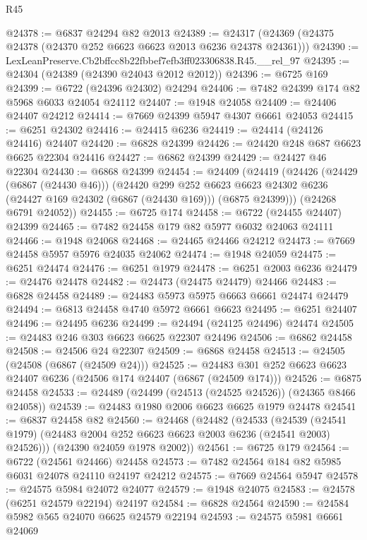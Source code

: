 \begin{lexlean}{R45}
\begin{coremodule}
{@24378 := @6837 @24294 @82 @2013
@24389 := @24317 (@24369 (@24375 @24378 (@24370 @252 @6623 @6623 @2013 @6236 @24378 @24361)))
@24390 := LexLeanPreserve.Cb2bffcc8b22fbbef7efb3ff023306838.R45.__rel_97
@24395 := @24304 (@24389 (@24390 @24043 @2012 @2012))
@24396 := @6725 @169
@24399 := @6722 (@24396 @24302) @24294
@24406 := @7482 @24399 @174 @82 @5968 @6033 @24054 @24112
@24407 := @1948 @24058
@24409 := @24406 @24407 @24212
@24414 := @7669 @24399 @5947 @4307 @6661 @24053
@24415 := @6251 @24302
@24416 := @24415 @6236
@24419 := @24414 (@24126 @24416) @24407
@24420 := @6828 @24399
@24426 := @24420 @248 @687 @6623 @6625 @22304 @24416
@24427 := @6862 @24399
@24429 := @24427 @46 @22304
@24430 := @6868 @24399
@24454 := @24409
    (@24419
      (@24426
        (@24429 (@6867 (@24430 @46)))
        (@24420
          @299
          @252
          @6623
          @6623
          @24302
          @6236
          (@24427 @169 @24302 (@6867 (@24430 @169)))
          (@6875 @24399)))
      (@24268 @6791 @24052))
@24455 := @6725 @174
@24458 := @6722 (@24455 @24407) @24399
@24465 := @7482 @24458 @179 @82 @5977 @6032 @24063 @24111
@24466 := @1948 @24068
@24468 := @24465 @24466 @24212
@24473 := @7669 @24458 @5957 @5976 @24035 @24062
@24474 := @1948 @24059
@24475 := @6251 @24474
@24476 := @6251 @1979
@24478 := @6251 @2003 @6236
@24479 := @24476 @24478
@24482 := @24473 (@24475 @24479) @24466
@24483 := @6828 @24458
@24489 := @24483 @5973 @5975 @6663 @6661 @24474 @24479
@24494 := @6813 @24458 @4740 @5972 @6661 @6623
@24495 := @6251 @24407
@24496 := @24495 @6236
@24499 := @24494 (@24125 @24496) @24474
@24505 := @24483 @246 @303 @6623 @6625 @22307 @24496
@24506 := @6862 @24458
@24508 := @24506 @24 @22307
@24509 := @6868 @24458
@24513 := @24505 (@24508 (@6867 (@24509 @24)))
@24525 := @24483 @301 @252 @6623 @6623 @24407 @6236 (@24506 @174 @24407 (@6867 (@24509 @174)))
@24526 := @6875 @24458
@24533 := @24489 (@24499 (@24513 (@24525 @24526)) (@24365 @8466 @24058))
@24539 := @24483 @1980 @2006 @6623 @6625 @1979 @24478
@24541 := @6837 @24458 @82
@24560 := @24468
    (@24482
      (@24533
        (@24539 (@24541 @1979) (@24483 @2004 @252 @6623 @6623 @2003 @6236 (@24541 @2003) @24526)))
      (@24390 @24059 @1978 @2002))
@24561 := @6725 @179
@24564 := @6722 (@24561 @24466) @24458
@24573 := @7482 @24564 @184 @82 @5985 @6031 @24078 @24110 @24197 @24212
@24575 := @7669 @24564 @5947
@24578 := @24575 @5984 @24072 @24077
@24579 := @1948 @24075
@24583 := @24578 (@6251 @24579 @22194) @24197
@24584 := @6828 @24564
@24590 := @24584 @5982 @565 @24070 @6625 @24579 @22194
@24593 := @24575 @5981 @6661 @24069
}
\end{coremodule}
\end{lexlean}
